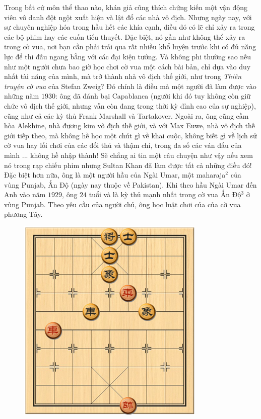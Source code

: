 \vspace*{170pt}
\begin{multicols}{2}
	Trong bất cứ môn thể thao nào, khán giả cũng thích chứng kiến một vận động viên vô danh đột ngột xuất hiện và lật đổ các nhà vô địch. Nhưng ngày nay, với sự chuyên nghiệp hóa trong hầu hết các khía cạnh, điều đó có lẽ chỉ xảy ra trong các bộ phim hay các cuốn tiểu thuyết. Đặc biệt, nó gần như không thể xảy ra trong cờ vua, nơi bạn cần phải trải qua rất nhiều khổ luyện trước khi có đủ năng lực để thi đấu ngang bằng với các đại kiện tướng. Và không phi thường sao nếu như một người chưa bao giờ học chơi cờ vua một cách bài bản, chỉ dựa vào duy nhất tài năng của mình, mà trở thành nhà vô địch thế giới, như trong \textit{Thiên truyện cờ vua} của Stefan Zweig?
	\vskip 0.05cm
	Đó chính là điều mà một người đã làm được vào những năm $1930$: ông đã đánh bại Capablanca (người khi đó tuy không còn giữ chức vô địch thế giới, nhưng vẫn còn đang trong thời kỳ đỉnh cao của sự nghiệp), cũng như cả các kỳ thủ Frank Marshall và Tartakover. Ngoài ra, ông cũng cầm hòa Alekhine, nhà đương kim vô địch thế giới, và với Max Euwe, nhà vô địch thế giới tiếp theo, mà không hề học một chút gì về khai cuộc, không biết gì về lịch sử cờ vua hay lối chơi của các đối thủ và thậm chí, trong đa số các ván đấu của mình ... không hề nhập thành!
	\vskip 0.1cm
	Sẽ chẳng ai tin một câu chuyện như vậy nếu xem nó trong rạp chiếu phim nhưng Sultan Khan đã làm được tất cả những điều đó! Đặc biệt hơn nữa, ông là một người hầu của Ngài Umar, một maharaja$^2$ của vùng Punjab, Ấn Độ (ngày nay thuộc về Pakistan). Khi theo hầu Ngài Umar đến Anh vào năm $1929$, ông $24$ tuổi và là kỳ thủ mạnh nhất trong cờ vua Ấn Độ$^3$ ở vùng Punjab. Theo yêu cầu của người chủ, ông học luật chơi của của cờ vua phương Tây.
	\begin{figure}[H]
		\vspace*{-5pt}
		\centering
		\captionsetup{labelformat= empty, justification=centering}
		\includegraphics[width= 0.58\linewidth]{1}

\end{figure}
\end{multicols}
